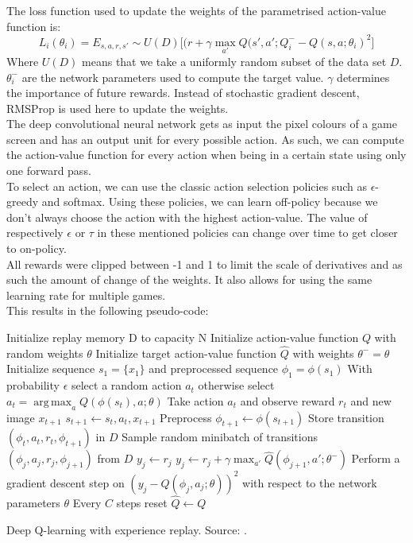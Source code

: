 \documentclass[a4paper]{article}
\DeclareMathOperator*{\argmax}{arg\,max}
\begin{document}
The loss function used to update the weights of the parametrised action-value function is:
\begin{equation}
L_i(\theta_i) = E_{s,a,r,s'} \sim U(D) \big [ (r + \gamma \max_{a'} Q(s',a'; Q^{-}_i - Q(s,a;\theta_i)^2 \big ]
\end{equation}
Where $U(D)$ means that we take a uniformly random subset of the data set $D$. $\theta^{-}_i$ are the network parameters used to compute the target value. $\gamma$ determines the importance of future rewards. Instead of stochastic gradient descent, RMSProp is used here to update the weights.\\

The deep convolutional neural network gets as input the pixel colours of a game screen and has an output unit for every possible action. As such, we can compute the action-value function for every action when being in a certain state using only one forward pass.\\

To select an action, we can use the classic action selection policies such as $\epsilon$-greedy and softmax. Using these policies, we can learn off-policy because we don't always choose the action with the highest action-value. The value of respectively $\epsilon$ or $\tau$ in these mentioned policies can change over time to get closer to on-policy.\\

All rewards were clipped between -1 and 1 to limit the scale of derivatives and as such the amount of change of the weights. It also allows for using the same learning rate for multiple games.\\
This results in the following pseudo-code:\\
\begin{algorithm}[H]
\DontPrintSemicolon
Initialize replay memory D to capacity N\;
Initialize action-value function $Q$ with random weights $\theta$\;
Initialize target action-value function $\hat{Q}$ with weights $\theta^- = \theta$\;
 {
	Initialize sequence $s_1 = \{x_1\}$ and preprocessed sequence $\phi_1 = \phi(s_1)$\;
     {
    	With probability $\epsilon$ select a random action $a_t$\;
        otherwise select $a_t = \argmax_a Q(\phi(s_t),a;\theta)$\;
        Take action $a_t$ and observe reward $r_t$ and new image $x_{t+1}$\;
        $s_{t+1} \gets s_t,a_t,x_{t+1}$\;
        Preprocess $\phi_{t+1} \gets \phi(s_{t+1})$\;
        Store transition $(\phi_t,a_t,r_t,\phi_{t+1})$ in $D$\;
        Sample random minibatch of transitions $(\phi_j,a_j,r_j,\phi_{j+1})$ from $D$\;
         {
        	$y_j \gets r_j$\;
        }{
        	$y_j \gets r_j + \gamma \max_{a'} \hat{Q}(\phi_{j+1},a';\theta^-)$\;
        }
        Perform a gradient descent step on $(y_j - Q(\phi_j,a_j;\theta))^2$ with respect to the network parameters $\theta$\;
        Every $C$ steps reset $\hat{Q} \gets Q$\;
    }
}
\caption{Deep Q-learning with experience replay. Source: \cite{mnih2013playing}.}
\end{algorithm}
\end{document}
